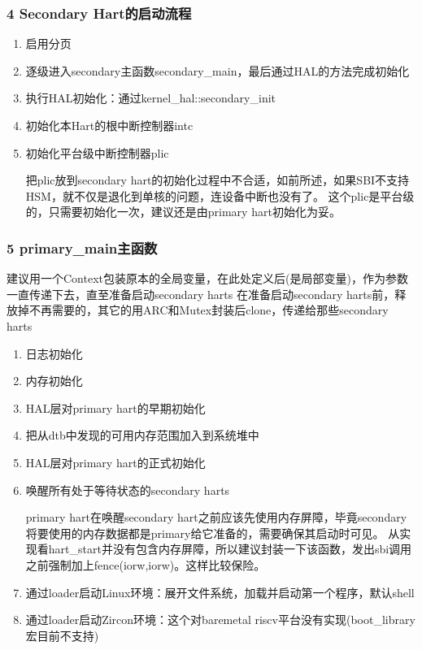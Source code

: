 \documentclass[
8pt, %
]{beamer}
\begin{document}
	\begin{frame}
		\frametitle{4 Secondary Hart的启动流程}
		\begin{enumerate}
			\item 启用分页
			\item 逐级进入secondary主函数secondary\_main，最后通过HAL的方法完成初始化
			\item 执行HAL初始化：通过kernel\_hal::secondary\_init
			\item 初始化本Hart的根中断控制器intc
			\item 初始化平台级中断控制器plic
			\begin{block}{}
				把plic放到secondary hart的初始化过程中不合适，如前所述，如果SBI不支持HSM，就不仅是退化到单核的问题，连设备中断也没有了。
				这个plic是平台级的，只需要初始化一次，建议还是由primary hart初始化为妥。
			\end{block}
		\end{enumerate}
	\end{frame}

	\begin{frame}
		\frametitle{5 primary\_main主函数}
		\begin{block}{}
			建议用一个Context包装原本的全局变量，在此处定义后(是局部变量)，作为参数一直传递下去，直至准备启动secondary harts
			在准备启动secondary harts前，释放掉不再需要的，其它的用ARC和Mutex封装后clone，传递给那些secondary harts
		\end{block}
		\begin{enumerate}
			\item 日志初始化
			\item 内存初始化
			\item HAL层对primary hart的早期初始化
			\item 把从dtb中发现的可用内存范围加入到系统堆中
			\item HAL层对primary hart的正式初始化
			\item 唤醒所有处于等待状态的secondary harts
			\begin{block}{}
				primary hart在唤醒secondary hart之前应该先使用内存屏障，毕竟secondary将要使用的内存数据都是primary给它准备的，需要确保其启动时可见。
				从实现看hart\_start并没有包含内存屏障，所以建议封装一下该函数，发出sbi调用之前强制加上fence(iorw,iorw)。这样比较保险。
			\end{block}
			\item 通过loader启动Linux环境：展开文件系统，加载并启动第一个程序，默认shell
			\item 通过loader启动Zircon环境：这个对baremetal riscv平台没有实现(boot\_library宏目前不支持)
		\end{enumerate}
	\end{frame}
\end{document}
